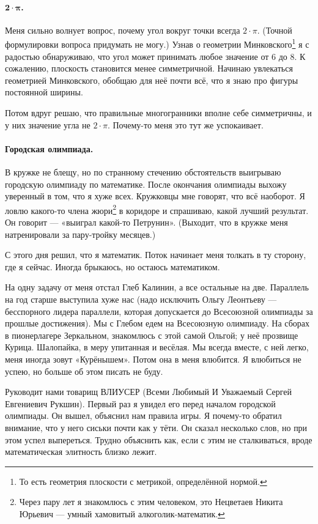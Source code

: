 \documentclass{book}
\begin{document}
\paragraph{$\bm{2{\cdot}\pi}$.}
Меня сильно волнует вопрос, почему угол вокруг точки всегда $2{\cdot}\pi$.
(Точной формулировки вопроса придумать не могу.)
Узнав о геометрии Минковского\footnote{То есть геометрия плоскости с метрикой, определённой нормой.} я с радостью обнаруживаю, что угол может принимать любое значение от $6$ до $8$.
К сожалению, плоскость становится менее симметричной.
Начинаю увлекаться геометрией Минковского, обобщаю для неё почти всё, что я знаю про фигуры постоянной ширины.

Потом вдруг решаю, что правильные многогранники вполне себе симметричны, и у них значение угла не  $2{\cdot}\pi$.
Почему-то меня это тут же успокаивает.

\paragraph{Городская олимпиада.}
В кружке не блещу, 
но по странному стечению обстоятельств выигрываю городскую олимпиаду по математике.
После окончания олимпиады выхожу уверенный в том, что я хуже всех.
Кружковцы мне говорят, что всё наоборот.
Я ловлю какого-то члена жюри\footnote{Через пару лет я знакомлюсь с этим человеком, 
это Нецветаев Никита Юрьевич --- умный хамовитый алкоголик-математик.}  
в коридоре и спрашиваю, какой лучший результат.
Он говорит --- «выиграл какой-то Петрунин».
(Выходит, что в кружке меня натренировали за пару-тройку месяцев.)

С этого дня решил, что я математик.
Поток начинает меня толкать в ту сторону, где я сейчас.
Иногда брыкаюсь, но остаюсь математиком.

На одну задачу от меня отстал Глеб Калинин, а все остальные на две.
Параллель на год старше выступила хуже нас
(надо исключить Ольгу Леонтьеву --- бесспорного лидера параллели, которая допускается до Всесоюзной олимпиады за прошлые достижения).  
Мы с Глебом едем на Всесоюзную олимпиаду.
На сборах в пионерлагере Зеркальном, 
знакомлюсь с этой самой Ольгой; у неё прозвище Курица.
Шалопайка,
в меру упитанная и весёлая.
Мы всегда вместе, с ней легко, меня иногда зовут «Курёнышем».
Потом она в меня влюбится.
Я влюбиться не успею, но больше об этом писать не буду.

Руководит нами товарищ ВЛИУСЕР (Всеми Любимый И Уважаемый Сергей Евгениевич Рукшин).
Первый раз я увидел его перед началом городской олимпиады.
Он вышел, объяснил нам правила игры.
Я почему-то обратил внимание,
что у него сиськи
почти как у тёти.
Он сказал несколько слов, 
но при этом успел выпереться.
Трудно объяснить как, если с этим не сталкиваться, вроде математическая элитность близко лежит.
\end{document}
